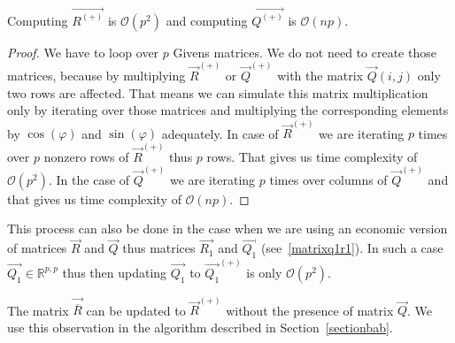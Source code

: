 \begin{observation} \label{qrinserttime}
Computing $\vec{R^{(+)}}$ is $\mathcal{O}(p^2)$ and computing $\vec{Q^{(+)}}$ is $\mathcal{O}(np)$.
\end{observation}

\begin{proof} \label{qrinsertproof}
We have to loop over $p$ Givens matrices. We do not need to create those matrices, because by multiplying $\vec{R}^{(+)}$ or $\vec{Q}^{(+)}$ with the matrix $\vec{Q}(i,j)$ only two rows are affected. That means we can simulate this matrix multiplication only by iterating over those matrices and multiplying the corresponding elements by $\cos(\varphi)$ and $\sin(\varphi)$ adequately. In case of $\vec{R}^{(+)}$ we are iterating $p$ times over $p$ nonzero rows of $\vec{R}^{(+)}$ thus $p$ rows. That gives us time complexity of $\mathcal{O}(p^2)$. In the case of $\vec{Q}^{(+)}$  we are iterating $p$ times over columns of $\vec{Q}^{(+)}$ and that gives us time complexity of $\mathcal{O}(np)$.
\end{proof}

\begin{note}
This process can also be done in the case when we are using an economic version of matrices $\vec{R}$ and $\vec{Q}$  thus matrices $\vec{R_1}$ and $\vec{Q_1}$ (see~\eqref{matrixq1r1}). In such a case
$\vec{Q_1} \in \mathbb{R}^{p, p}$ thus then updating $\vec{Q_1}$ to $\vec{Q_1}^{(+)}$ is only $\mathcal{O}(p^2)$.
\end{note}

\begin{note} \label{qnotrequired}
The matrix $\vec{\overline{R}}$  can be updated to $\vec{R}^{(+)}$  without the presence of matrix $\vec{Q}$. We use this observation  in the algorithm described in Section~\ref{sectionbab}.
\end{note}




